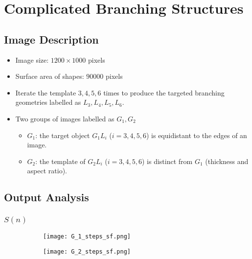 \section{Complicated Branching Structures}


   \subsection{Image Description}

     \begin{itemize}
         \item Image size: $1200 \times 1000$ pixels
         \item Surface area of shapes: $90000$ pixels
         \item Iterate the template $3, 4, 5, 6$ times to produce the targeted branching geometries labelled as $L_3, L_4, L_5, L_6$.
         \item Two groups of images labelled as $G_1, G_2$

           \begin{itemize}
             \item $G_1$: the target object $G_1 L_i$ ($i=3, 4, 5, 6$) is equidistant to the edges of an image.
             \item $G_2$: the template of $G_2 L_i$ ($i=3, 4, 5, 6$) is distinct from $G_1$ (thickness and aspect ratio). 
           \end{itemize}
           
     \end{itemize}



   \subsection{Output Analysis}


     \subsubsection{$S(n)$}
   
      \begin{figure}[h!]
        \centering
        
        \begin{subfigure}[b]{0.45\textwidth}
          \texttt{[image: G\_1\_steps\_sf.png]}
          \caption{}
          \label{fig:sf_g1_branch_steps}
        \end{subfigure}
        \hfill
        \begin{subfigure}[b]{0.45\textwidth}
          \texttt{[image: G\_2\_steps\_sf.png]}
          \caption{}
          \label{fig:sf_g2_branch_steps}
        \end{subfigure}

        \caption{}
        \label{fig:sf_branch_steps}

      \end{figure}



